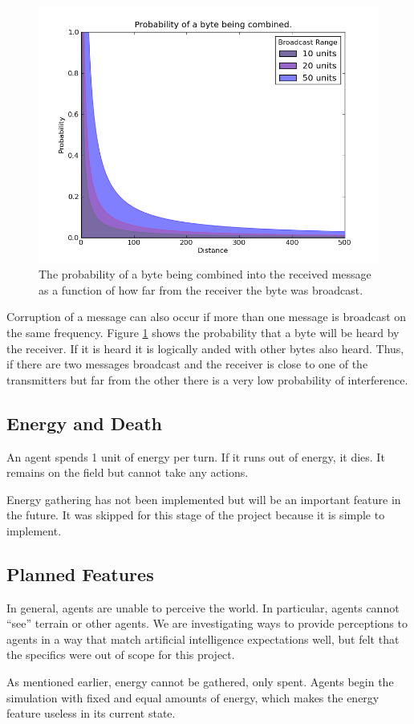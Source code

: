\begin{figure}[h!]
    \begin{center}
        \includegraphics[width=6in]{figures/combine.png}
    \end{center}
    \caption{The probability of a byte being combined into the received message as a function of
        how far from the receiver the byte was broadcast.}
    \label{combine}
\end{figure}

Corruption of a message can also occur if more than one message is broadcast on the same frequency.
Figure \ref{combine} shows the probability that a byte will be heard by the receiver. If it is heard
it is logically anded with other bytes also heard. Thus, if there are two messages broadcast and the
receiver is close to one of the transmitters but far from the other there is a very low probability
of interference.

\subsection{Energy and Death}

An agent spends 1 unit of energy per turn. If it runs out of energy, it dies. It remains on the
field but cannot take any actions.

Energy gathering has not been implemented but will be an important feature in the future. It was
skipped for this stage of the project because it is simple to implement.

\subsection{Planned Features}

In general, agents are unable to perceive the world. In particular, agents cannot ``see'' terrain or
other agents. We are investigating ways to provide perceptions to agents in a way that match
artificial intelligence expectations well, but felt that the specifics were out of scope for this
project.

As mentioned earlier, energy cannot be gathered, only spent. Agents begin the simulation with fixed
and equal amounts of energy, which makes the energy feature useless in its current state.
